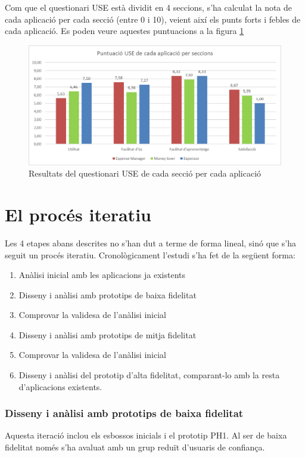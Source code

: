 Com que el questionari USE està dividit en 4 seccions, s'ha calculat la nota de cada aplicació per cada secció (entre 0 i 10), veient així els punts forts i febles de cada aplicació. Es poden veure aquestes puntuacions a la figura \ref{fig:USE_2}

\begin{figure}[htp]
\centering
\includegraphics[scale=0.7]{USE_3.png}
\caption{Resultats del questionari USE de cada secció per cada aplicació}\label{fig:USE_2}
\end{figure}

\section{El procés iteratiu}
Les 4 etapes abans descrites no s'han dut a terme de forma lineal, sinó que s'ha seguit un procés iteratiu. Cronològicament l'estudi s'ha fet de la següent forma:

\begin{enumerate}
\item Anàlisi inicial amb les aplicacions ja existents
\item Disseny i anàlisi amb prototips de baixa fidelitat
\item Comprovar la validesa de l'anàlisi inicial
\item Disseny i anàlisi amb prototips de mitja fidelitat
\item Comprovar la validesa de l'anàlisi inicial
\item Disseny i anàlisi del prototip d'alta fidelitat, comparant-lo amb la resta d'aplicacions existents.
\end{enumerate}

\subsubsection{Disseny i anàlisi amb prototips de baixa fidelitat}
Aquesta iteració inclou els esbossos inicials i el prototip PH1. Al ser de baixa fidelitat només s'ha avaluat amb un grup reduït d'usuaris de confiança.
